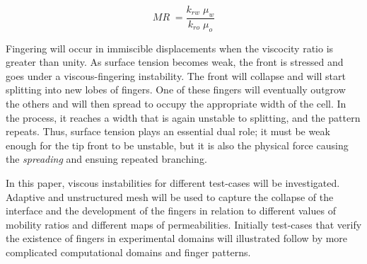 \documentclass[preprint,authoryear,12pt]{elsarticle}
\begin{document}
\begin{equation}
 MR \; = \frac{k_{rw} \; \mu_{w}}{k_{ro} \; \mu_{o}} 
\label{eq:MR}
\end{equation}

\noindent Fingering will occur in immiscible displacements when the viscocity ratio is greater than unity. %
As surface tension becomes weak, the front is stressed and goes under a viscous-fingering instability. The front will collapse and will start splitting into new lobes of fingers. One of these fingers will eventually outgrow the others and will then spread to occupy the appropriate width of the cell. In the process, it reaches a width that is again unstable to splitting, and the pattern repeats. Thus, surface tension plays an essential dual role; it must be weak enough for the tip front to be unstable, but it is also the physical force causing the \textit{spreading} and ensuing repeated branching.

In  this paper, viscous instabilities for different test-cases will be investigated. Adaptive and unstructured mesh will be used to capture the collapse of the interface and the development of the fingers in relation to different values of mobility ratios and different maps of permeabilities. Initially test-cases that verify the existence of fingers in experimental domains will illustrated follow by more complicated computational domains and finger patterns.  
\end{document}
